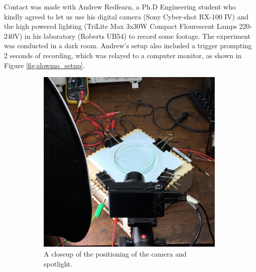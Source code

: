 Contact was made with Andrew Redfearn, a Ph.D Engineering student who kindly agreed to let us use his digital camera (Sony Cyber-shot RX-100 IV) and the high powered lighting (TriLite Max 3x30W Compact Flourescent Lamps 220-240V) in his laboratory (Roberts UB54) to record some footage. The experiment was conducted in a dark room. Andrew's setup also included a trigger prompting 2 seconds of recording, which was relayed to a computer monitor, as shown in Figure \ref{fig:slowmo_setup}.

\begin{figure}[ht]
\centering
    \begin{subfigure}[t]{0.475\textwidth}
    \centering
        \includegraphics[width=\textwidth]{prototype/exp_rep_imgs/closeup_slowmo_setup.jpg}
        \caption{A closeup of the positioning of the camera and spotlight.}
    \end{subfigure}
    \begin{subfigure}[t]{0.475\textwidth}
    \centering

\end{subfigure}
\end{figure}

